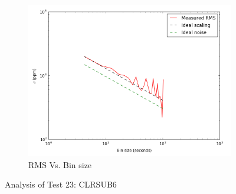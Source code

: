 \documentclass{aastex6}
\begin{document}
\begin{figure}[H]
    \begin{subfigure}{3}
        \includegraphics[scale=0.6]{rms_test23}
        \caption{RMS Vs. Bin size}
    \end{subfigure}
    \caption{Analysis of Test 23: CLRSUB6}
\end{figure}
\end{document}
